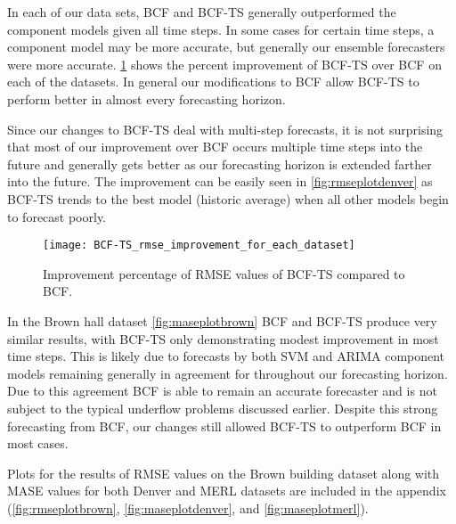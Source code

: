 In each of our data sets, BCF and BCF-TS generally outperformed the component models given all time steps.  In some cases for certain time steps, a component model may be more accurate, but generally our ensemble forecasters were more accurate.  \ref{fig:bcftsrmseimprovement} shows the percent improvement of BCF-TS over BCF on each of the datasets.  In general our modifications to BCF allow BCF-TS to perform better in almost every forecasting horizon.  

Since our changes to BCF-TS deal with multi-step forecasts, it is not surprising that most of our improvement over BCF occurs multiple time steps into the future and generally gets better as our forecasting horizon is extended farther into the future.  The improvement can be easily seen in \ref{fig:rmseplotdenver} as BCF-TS trends to the best model (historic average) when all other models begin to forecast poorly.

\begin{figure}[!h]
	\begin{center}
		\texttt{[image: BCF-TS\_rmse\_improvement\_for\_each\_dataset]}
	\end{center}
	\caption{Improvement percentage of RMSE values of BCF-TS compared to BCF.}
	\label{fig:bcftsrmseimprovement}
\end{figure}

In the Brown hall dataset \ref{fig:maseplotbrown} BCF and BCF-TS produce very similar results, with BCF-TS only demonstrating modest improvement in most time steps.  This is likely due to forecasts by both SVM and ARIMA component models remaining generally in agreement for throughout our forecasting horizon.  Due to this agreement BCF is able to remain an accurate forecaster and is not subject to the typical underflow problems discussed earlier.  Despite this strong forecasting from BCF, our changes still allowed BCF-TS to outperform BCF in most cases.

Plots for the results of RMSE values on the Brown building dataset along with MASE values for both Denver and MERL datasets are included in the appendix (\ref{fig:rmseplotbrown}, \ref{fig:maseplotdenver}, and \ref{fig:maseplotmerl}).

